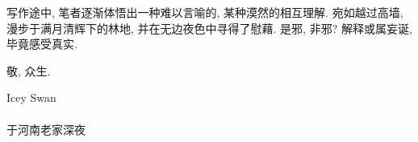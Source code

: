 写作途中, 笔者逐渐体悟出一种难以言喻的, 某种漠然的相互理解. 宛如越过高墙, 漫步于满月清辉下的林地, 并在无边夜色中寻得了慰藉. 是邪, 非邪? 解释或属妄诞, 毕竟感受真实.

敬, 众生.
\begin{flushright}
    Icey Swan\\
    \zhtoday\\
    于河南老家深夜
\end{flushright}